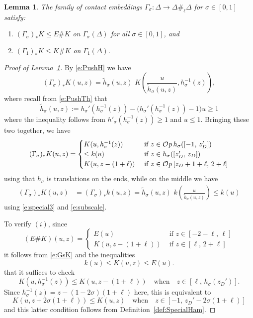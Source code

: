 \documentclass[12pt]{paper}
\theoremstyle{plain}
\newtheorem{lemma}[theorem]{Lemma}
\theoremstyle{definition}
\newcommand{\eps}{\varepsilon}
\def\Op{{\mathcal O}{\it p}\,}
\numberwithin{figure}{section}
\begin{document}
\begin{lemma}\label{p:ContEmb1}
	The family of contact embeddings $\Gamma_\sigma: \Delta \to \Delta \#_{\ell} \Delta$ for $\sigma \in [0,1]$
	satisfy:
	\begin{enumerate}
	\item $(\Gamma_\sigma)_*K \leq E\# K$ on $\Gamma_\sigma(\Delta)$ for all $\sigma \in [0,1]$, and
	\item $(\Gamma_1)_*K \leq K\# K$ on $\Gamma_1(\Delta)$.
	\end{enumerate}
\end{lemma}

\begin{proof}[Proof of Lemma~\ref{p:ContEmb1}]
By \eqref{e:PushH} we have
$$
	(\Gamma_\sigma)_*K(u,z) = \tilde{h}_\sigma(u,z)\,\, K\!\left(\frac{u}{\tilde{h}_\sigma(u,z)}, h^{-1}_\sigma(z)\right),
$$
where recall from \eqref{e:PushTh} that
$$\tilde{h}_\sigma(u,z):= h_\sigma'(h_\sigma^{-1}(z)) - \big(h_\sigma'(h_\sigma^{-1}(z)) - 1\big)u \geq 1$$ 
where the inequality follows from $h'_\sigma(h^{-1}_\sigma(z)) \geq 1$ and $u \leq 1$.
Bringing these two together, we have
\begin{equation}\label{e:GsK}
	(\Gamma_\sigma)_*K(u,z) = \begin{cases} K(u,h_\sigma^{-1}(z)) & \mbox{ if } z \in \Op h_\sigma([-1,\, z_D'])\\
	\leq k(u) &  \mbox{ if } z \in h_\sigma([z_D',\, z_D])\\ %
	K(u,z -(1+\ell)) & \mbox{ if } z \in \Op [z_D+1+\ell,\, 2+\ell]
	\end{cases}
\end{equation}
using that $h_\sigma$ is translations on the ends, while on the middle we have
\begin{align*}
	(\Gamma_\sigma)_*K(u,z) &= (\Gamma_\sigma)_*k(u,z) = \tilde{h}_\sigma(u,z)\,\, k\!\left(\frac{u}{\tilde{h}_\sigma(u,z)}\right) \leq
	k(u) 
\end{align*}
using \eqref{e:special3} and \eqref{e:subscale}.  

To verify $(i)$, since
$$
	(E\# K)(u,z) = \begin{cases} E(u) & \mbox{ if } z \in [-2-\ell,\, \ell]\\
	K(u,z-(1+\ell)) & \mbox{ if } z \in [\ell,\, 2+\ell]
	\end{cases}
$$
it follows from \eqref{e:GsK} and the inequalities
\begin{equation}\label{e:INEM}
	k(u) \leq K(u,z) \leq E(u).
\end{equation}
that it suffices to check
$$
	K(u, h_\sigma^{-1}(z)) \leq K(u, z-(1+\ell)) \quad\mbox{when}\quad z \in [\ell,\, h_\sigma(z_D')].
$$
Since $h_\sigma^{-1}(z) = z-(1-2\sigma)(1+\ell)$ here, this is equivalent to
$$
	K(u, z+2\sigma(1+\ell)) \leq K(u, z) \quad\mbox{when}\quad z \in [-1,\, z_D' -2\sigma(1+\ell)]
$$
and this latter condition follows from Definition~\ref{def:SpecialHam}.


\end{proof}
\end{document}
